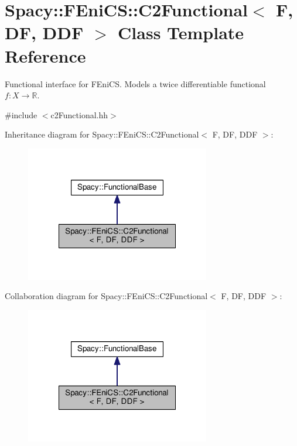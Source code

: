 \hypertarget{classSpacy_1_1FEniCS_1_1C2Functional}{\section{Spacy\-:\-:F\-Eni\-C\-S\-:\-:C2\-Functional$<$ F, D\-F, D\-D\-F $>$ Class Template Reference}
\label{classSpacy_1_1FEniCS_1_1C2Functional}
}


Functional interface for F\-Eni\-C\-S. Models a twice differentiable functional $f:X\rightarrow \mathbb{R}$.  




{\ttfamily \#include $<$c2\-Functional.\-hh$>$}



Inheritance diagram for Spacy\-:\-:F\-Eni\-C\-S\-:\-:C2\-Functional$<$ F, D\-F, D\-D\-F $>$\-:
\nopagebreak
\begin{figure}[H]
\begin{center}
\leavevmode
\includegraphics[width=228pt]{classSpacy_1_1FEniCS_1_1C2Functional__inherit__graph}
\end{center}
\end{figure}


Collaboration diagram for Spacy\-:\-:F\-Eni\-C\-S\-:\-:C2\-Functional$<$ F, D\-F, D\-D\-F $>$\-:
\nopagebreak
\begin{figure}[H]
\begin{center}
\leavevmode
\includegraphics[width=228pt]{classSpacy_1_1FEniCS_1_1C2Functional__coll__graph}
\end{center}
\end{figure}

